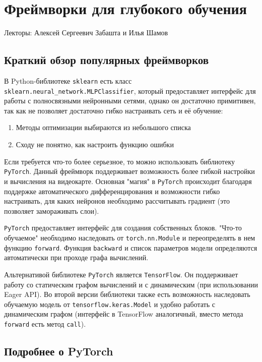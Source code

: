 \chapter{Фреймворки для глубокого обучения}

Лекторы: Алексей Сергеевич Забашта и Илья Шамов

\section{Краткий обзор популярных фреймворков}

В Python-библиотеке \texttt{sklearn} есть класс \texttt{sklearn.neural\_network.MLPClassifier}, который предоставляет интерфейс для работы с полносвязными нейронными сетями, однако он достаточно примитивен, так как не позволяет достаточно гибко настраивать сеть и её обучение:
\begin{enumerate}
    \item Методы оптимизации выбираются из небольшого списка
    \item Сходу не понятно, как настроить функцию ошибки
\end{enumerate}

Если требуется что-то более серьезное, то можно использовать библиотеку \texttt{PyTorch}. Данный фреймворк поддерживает возможность более гибкой настройки и вычисления на видеокарте. Основная "магия" в \texttt{PyTorch} происходит благодаря поддержке автоматического дифференцирования и возможности гибко настраивать, для каких нейронов необходимо рассчитывать градиент (это позволяет замораживать слои).
\begin{remark}
    \texttt{PyTorch} предоставляет интерфейс для создания собственных блоков. "Что-то обучаемое" необходимо наследовать от \texttt{torch.nn.Module} и переопределять в нем функцию \texttt{forward}. Функция \texttt{backward} и список параметров модели определяются автоматически при проходе графа вычислений.
\end{remark}

Альтернативой библиотеке \texttt{PyTorch} является \texttt{TensorFlow}. Он поддерживает работу со статическим графом вычислений и с динамическим (при использовании Eager API). Во второй версии библиотеки также есть возможность наследовать обучаемую модель от \texttt{tensorflow.keras.Model} и удобно работать с динамическим графом (интерфейс в TensorFlow аналогичный, вместо метода \texttt{forward} есть метод \texttt{call}).

 \section{Подробнее о PyTorch}

